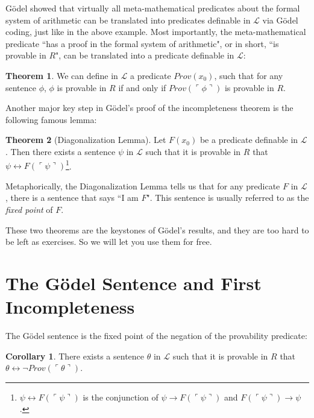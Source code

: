 \documentclass[11pt]{article}
\theoremstyle{definition}
\newtheorem{theorem}{Theorem}[section]
\newtheorem{corollary}{Corollary}[theorem]
\begin{document}
G\"odel showed that virtually all meta-mathematical predicates about the formal system of arithmetic can be translated into predicates definable in $\mathscr{L}$ via G\"odel coding, just like in the above example. Most importantly, the meta-mathematical predicate ``has a proof in the formal system of arithmetic", or in short, ``is provable in $R$", can be translated into a predicate definable in $\mathscr{L}$:

\begin{theorem}\label{Prov}
We can define in $\mathscr{L}$ a predicate $Prov(x_0)$, such that for any sentence $\phi$, $\phi$ is provable in $R$ if and only if $Prov(\ulcorner \phi \urcorner)$ is provable in $R$.
\end{theorem}

Another major key step in G\"odel's proof of the incompleteness theorem is the following famous lemma:

\begin{theorem}[Diagonalization Lemma] \label{DL}
 Let $F(x_0)$ be a predicate definable in $\mathscr{L}$. Then there exists a sentence $\psi$ in $\mathscr{L}$ such that it is provable in $R$ that $\psi \leftrightarrow F(\ulcorner \psi \urcorner )$\footnote{$\psi \leftrightarrow F(\ulcorner \psi \urcorner)$ is the conjunction of $\psi \rightarrow F(\ulcorner \psi \urcorner)$ and $F(\ulcorner \psi \urcorner) \rightarrow \psi$.}.

\end{theorem}

Metaphorically, the Diagonalization Lemma tells us that for any predicate $F$ in $\mathscr{L}$, there is a sentence that says ``I am $F$". This sentence is usually referred to as the \textit{fixed point} of $F$.

These two theorems are the keystones of G\"odel's results, and they are too hard to be left as exercises. So we will let you use them for free.

\section{The G\"odel Sentence and First Incompleteness}

The G\"odel sentence is the fixed point of the negation of the provability predicate:

\begin{corollary} \label{GS}
There exists a sentence $\theta$ in $\mathscr{L}$ such that it is provable in $R$ that $\theta \leftrightarrow \neg Prov (\ulcorner \theta \urcorner)$.
\end{corollary}
\end{document}
